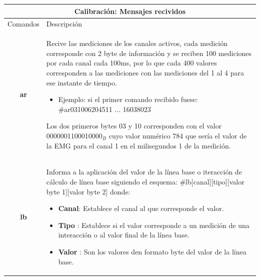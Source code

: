 \begin{table}[ht]
    \centering
    \begin{tabular}{ |c|p{14cm}|}
        \hline
        \multicolumn{2}{|c|}{Calibración: Mensajes recividos} \\
        \hline
        Comandos        &   Descripción \\\hline
        \textbf{ar}     &   \begin{minipage}{14cm}
                                \vspace{2pt}    
                                Recive las mediciones de los canales activos, cada medición corresponde con 2 byte de información y se reciben 100 mediciones por cada canal cada 100ms, 
                                por lo que cada 400 valores corresponden a las mediciones con las mediciones del 1 al 4 para ese instante de tiempo.
                                \begin{itemize}
                                    \item Ejemplo: si el primer comando recibido fuese: \#ar031006204511 ... 16038023
                                \end{itemize}
                                Los dos primeros bytes 03 y 10 corresponden con el valor 0000001100010000$_{B}$ cuyo valor numérico  784 que sería el valor de la EMG para el canal 1 en el milisegundos 
                                1 de la medición.
                                \vspace{2pt}    
                            \end{minipage}\\\hline    
        \textbf{lb}     &   \begin{minipage}{14cm}
                                \vspace{1pt}
                                Informa a la aplicación del valor de la línea base o iteracción de cálculo de línea base siguiendo el esquema: \#lb[canal][tipo][valor byte 1][valor byte 2] donde:
                                \begin{itemize}
                                    \item \textbf{Canal}: Establece el canal al que corresponde el valor.
                                    \item \textbf{Tipo} : Establece si el valor corresponde a un medición de una interacción o al valor final de la línea base.
                                    \item \textbf{Valor} : Son los valores den formato byte del valor de la línea base.  

\end{itemize}
\end{minipage}
\end{tabular}
\end{table}
